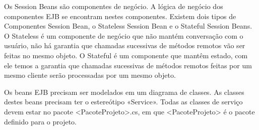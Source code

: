 Os Session Beans são componentes de negócio. A lógica de negócio dos componentes EJB se encontram nestes componentes. Existem dois tipos de Componentes Session Bean, o Stateless Session Bean e o Stateful Session Beans. O Stateless é um componente de negócio que não mantém conversação com o usuário, não há garantia que chamadas sucessivas de métodos remotos vão ser feitas no mesmo objeto. O Stateful é um componente que mantêm estado, com ele temos a garantia que chamadas sucessivas de métodos remotos feitas por um mesmo cliente serão processadas por um mesmo objeto.

Os beans EJB precisam ser modelados em um diagrama de classes. As classes destes beans precisam ter o estereótipo «Service». Todas as classes de serviço devem estar no pacote <PacoteProjeto>.cs, em que <PacoteProjeto> é o pacote definido para o projeto.

